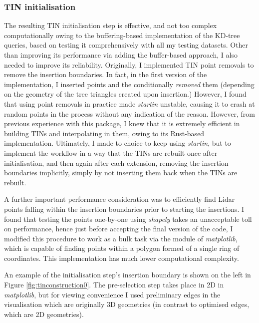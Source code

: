 \subsubsection{TIN initialisation}

The resulting TIN initialisation step is effective, and not too complex computationally owing to the buffering-based implementation of the KD-tree queries, based on testing it comprehensively with all my testing datasets. Other than improving its performance via adding the buffer-based approach, I also needed to improve its reliability. Originally, I implemented TIN point removals to remove the insertion boundaries. In fact, in the first version of the implementation, I inserted points and the conditionally \textit{removed} them (depending on the geometry of the tree triangles created upon insertion.) However, I found that using point removals in practice made \textit{startin} unstable, causing it to crash at random points in the process without any indication of the reason. However, from previous experience with this package, I knew that it is extremely efficient in building TINs and interpolating in them, owing to its Rust-based implementation. Ultimately, I made to choice to keep using \textit{startin}, but to implement the workflow in a way that the TINs are rebuilt once after initialisation, and then again after each extension, removing the insertion boundaries implicitly, simply by not inserting them back when the TINs are rebuilt.

A further important performance consideration was to efficiently find Lidar points falling within the insertion boundaries prior to starting the insertions. I found that testing the points one-by-one using \textit{shapely} takes an unacceptable toll on performance, hence just before accepting the final version of the code, I modified this procedure to work as a bulk task via the  module of \textit{matplotlib}, which is capable of finding points within a polygon formed of a single ring of coordinates. This implementation has much lower computational complexity.

An example of the initialisation step's insertion boundary is shown on the left in Figure \ref{fig:tinconstruction0}. The pre-selection step takes place in 2D in \textit{matplotlib}, but for viewing convenience I used preliminary edges in the visualisation which are originally 3D geometries (in contrast to optimised edges, which are 2D geometries).

